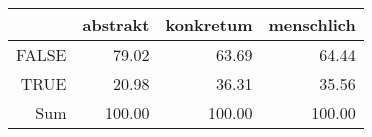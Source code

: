 \begin{tabular}{rrrr}
  \hline
 & abstrakt & konkretum & menschlich \\ 
  \hline
FALSE & 79.02 & 63.69 & 64.44 \\ 
  TRUE & 20.98 & 36.31 & 35.56 \\ 
  Sum & 100.00 & 100.00 & 100.00 \\ 
   \hline
\end{tabular}
